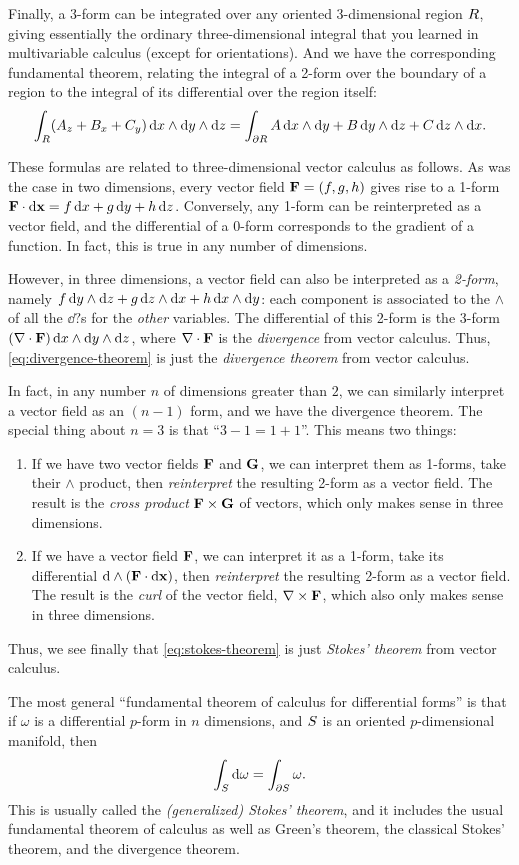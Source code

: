 \documentclass[12pt]{amsart}
\begin{document}
Finally, a 3-form can be integrated over any oriented 3-dimensional region $R$, giving essentially the ordinary three-dimensional integral that you learned in multivariable calculus (except for orientations).
And we have the corresponding fundamental theorem, relating the integral of a 2-form over the boundary of a region to the integral of its differential over the region itself:
\begin{equation}
  \int_{R} ({A}_{z} + {B}_{x} + {C}_{y})\, {\mathrm{d} x}\wedge{\ensuremath{\mathrm{d} y}}\wedge {\ensuremath{\mathrm{d} z}} = \int_{\partial R} A\,{\mathrm{d} x}\wedge{\ensuremath{\mathrm{d} y}} + B\,{\mathrm{d} y}\wedge{\ensuremath{\mathrm{d} z}} + C \,{\mathrm{d} z}\wedge{\ensuremath{\mathrm{d} x}}.\label{eq:divergence-theorem}
\end{equation}

These formulas are related to three-dimensional vector calculus as follows.
As was the case in two dimensions, every vector field $\mathbf{F}=(f,g,h)$ gives rise to a 1-form $\mathbf{F} \cdot {\ensuremath{\mathrm{d} \mathbf{x}}} = f\,{\mathrm{d} x} + g\,{\mathrm{d} y} + h\,{\mathrm{d} z}$.
Conversely, any 1-form can be reinterpreted as a vector field, and the differential of a 0-form corresponds to the gradient of a function.
In fact, this is true in any number of dimensions.

However, in three dimensions, a vector field can also be interpreted as a \emph{2-form}, namely $f\,{\mathrm{d} y}\wedge{\ensuremath{\mathrm{d} z}} + g \,{\mathrm{d} z}\wedge{\ensuremath{\mathrm{d} x}} + h \,{\mathrm{d} x}\wedge{\ensuremath{\mathrm{d} y}}$: each component is associated to the $\wedge$ of all the $\dd?$s for the \emph{other} variables.
The differential of this 2-form is the 3-form $(\nabla \cdot \mathbf{F})\,{\mathrm{d} x}\wedge{\ensuremath{\mathrm{d} y}}\wedge{\ensuremath{\mathrm{d} z}}$, where $\nabla \cdot \mathbf{F}$ is the \emph{divergence} from vector calculus.
Thus, \cref{eq:divergence-theorem} is just the \emph{divergence theorem} from vector calculus.

In fact, in any number $n$ of dimensions greater than $2$, we can similarly interpret a vector field as an $(n-1)$ form, and we have the divergence theorem.
The special thing about $n=3$ is that ``$3-1 = 1+1$''.
This means two things:
\begin{enumerate}
\item If we have two vector fields $\mathbf{F}$ and $\mathbf{G}$, we can interpret them as 1-forms, take their $\wedge$ product, then \emph{reinterpret} the resulting 2-form as a vector field.
  The result is the \emph{cross product} $\mathbf{F} \times \mathbf{G}$ of vectors, which only makes sense in three dimensions.
\item If we have a vector field $\mathbf{F}$, we can interpret it as a 1-form, take its differential $\mathrm{d}\wedge(\mathbf{F} \cdot {\ensuremath{\mathrm{d} \mathbf{x}}})$, then \emph{reinterpret} the resulting 2-form as a vector field.
  The result is the \emph{curl} of the vector field, $\nabla \times \mathbf{F}$, which also only makes sense in three dimensions.
\end{enumerate}
Thus, we see finally that \cref{eq:stokes-theorem} is just \emph{Stokes' theorem} from vector calculus.

The most general ``fundamental theorem of calculus for differential forms'' is that if $\omega$ is a differential $p$-form in $n$ dimensions, and $S$ is an oriented $p$-dimensional manifold, then
\[ \int_{S} \mathrm{d}\omega = \int_{\partial S} \omega. \]
This is usually called the \emph{(generalized) Stokes' theorem}, and it includes the usual fundamental theorem of calculus as well as Green's theorem, the classical Stokes' theorem, and the divergence theorem.
\end{document}
